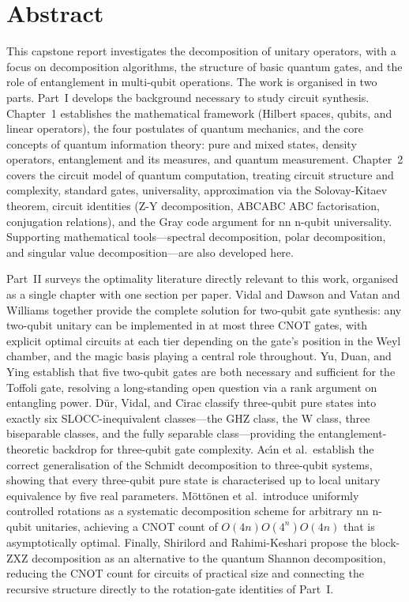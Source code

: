 \documentclass[12pt, a4paper, oneside]{report}
\theoremstyle{plain}
\theoremstyle{definition}
\theoremstyle{remark}
\begin{document}
\clearpage
\thispagestyle{plain}
\chapter*{Abstract}

This capstone report investigates the decomposition of unitary operators, with a focus on decomposition algorithms, the structure of basic quantum gates, and the role of entanglement in multi-qubit operations. The work is organised in two parts.
Part~I develops the background necessary to study circuit synthesis. Chapter~1 establishes the mathematical framework (Hilbert spaces, qubits, and linear operators), the four postulates of quantum mechanics, and the core concepts of quantum information theory: pure and mixed states, density operators, entanglement and its measures, and quantum measurement. Chapter~2 covers the circuit model of quantum computation, treating circuit structure and complexity, standard gates, universality, approximation via the Solovay-Kitaev theorem, circuit identities (Z-Y decomposition, ABCABC
ABC factorisation, conjugation relations), and the Gray code argument for nn
n-qubit universality. Supporting mathematical tools---spectral decomposition, polar decomposition, and singular value decomposition---are also developed here. 

Part~II surveys the optimality literature directly relevant to this work, organised as a single chapter with one section per paper. Vidal and Dawson and Vatan and Williams together provide the complete solution for two-qubit gate synthesis: any two-qubit unitary can be implemented in at most three CNOT gates, with explicit optimal circuits at each tier depending on the gate's position in the Weyl chamber, and the magic basis playing a central role throughout. Yu, Duan, and Ying establish that five two-qubit gates are both necessary and sufficient for the Toffoli gate, resolving a long-standing open question via a rank argument on entangling power. D\"{u}r, Vidal, and Cirac classify three-qubit pure states into exactly six SLOCC-inequivalent classes---the GHZ class, the W class, three biseparable classes, and the fully separable class---providing the entanglement-theoretic backdrop for three-qubit gate complexity. Ac\'{\i}n et al.\ establish the correct generalisation of the Schmidt decomposition to three-qubit systems, showing that every three-qubit pure state is characterised up to local unitary equivalence by five real parameters. M\"{o}tt\"{o}nen et al.\ introduce uniformly controlled rotations as a systematic decomposition scheme for arbitrary nn
n-qubit unitaries, achieving a CNOT count of $O(4n)O(4^n)
O(4n)$ that is asymptotically optimal. Finally, Shirilord and Rahimi-Keshari propose the block-ZXZ decomposition as an alternative to the quantum Shannon decomposition, reducing the CNOT count for circuits of practical size and connecting the recursive structure directly to the rotation-gate identities of Part~I.
\end{document}
